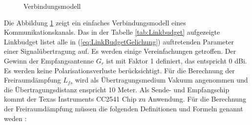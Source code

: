 \begin{figure}[!ht]
\begin{center}
\end{center}
\caption{Verbindungsmodell}
\label{fig:LinkModell}
\end{figure}

Die Abbildung \ref{fig:LinkModell} zeigt ein einfaches Verbindungsmodell eines Kommunikationskanals. Das in der Tabelle \ref{tab:Linkbudget} aufgezeigte Linkbudget listet alle in (\ref{eq:LinkBudgetGelichung}) auftretenden Parameter einer Signalübertragung auf. Es werden einige Vereinfachungen getroffen. Der Gewinn der Empfangsantenne $G_{r}$ ist mit Faktor 1 definiert, das entspricht 0 dBi. Es werden keine Polarisationsverluste berücksichtigt. Für die Berechnung der Freiraumdämpfung $L_{fs}$ wird als Übertragungsmedium Vakuum angenommen und die Übertragungsdistanz enspricht 10 Meter. Als Sende- und Empfangschip kommt der Texas Instruments CC2541 Chip zu Anwendung. Für die Berechnung der Freiraumdämpfung müssen die folgenden Definitionen und Formeln genannt weden \cite{Tekom}:
 
